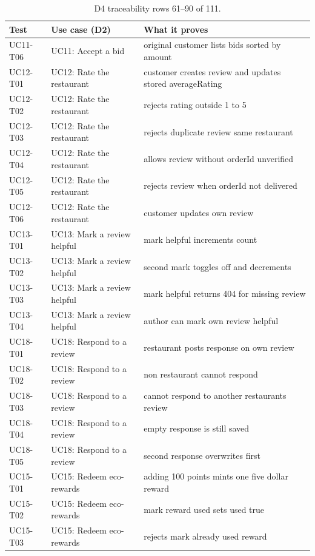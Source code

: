 \begin{table}[t]
\caption{D4 traceability rows 61--90 of 111.}
\label{tab:d4t3}
\centering\scriptsize
\begin{tabular}{p{3.2cm}p{4.0cm}p{5.8cm}}
\toprule
Test & Use case (D2) & What it proves \\
\midrule
UC11-T06 & UC11: Accept a bid & original customer lists bids sorted by amount \\
UC12-T01 & UC12: Rate the restaurant & customer creates review and updates stored averageRating \\
UC12-T02 & UC12: Rate the restaurant & rejects rating outside 1 to 5 \\
UC12-T03 & UC12: Rate the restaurant & rejects duplicate review same restaurant \\
UC12-T04 & UC12: Rate the restaurant & allows review without orderId unverified \\
UC12-T05 & UC12: Rate the restaurant & rejects review when orderId not delivered \\
UC12-T06 & UC12: Rate the restaurant & customer updates own review \\
UC13-T01 & UC13: Mark a review helpful & mark helpful increments count \\
UC13-T02 & UC13: Mark a review helpful & second mark toggles off and decrements \\
UC13-T03 & UC13: Mark a review helpful & mark helpful returns 404 for missing review \\
UC13-T04 & UC13: Mark a review helpful & author can mark own review helpful \\
UC18-T01 & UC18: Respond to a review & restaurant posts response on own review \\
UC18-T02 & UC18: Respond to a review & non restaurant cannot respond \\
UC18-T03 & UC18: Respond to a review & cannot respond to another restaurants review \\
UC18-T04 & UC18: Respond to a review & empty response is still saved \\
UC18-T05 & UC18: Respond to a review & second response overwrites first \\
UC15-T01 & UC15: Redeem eco-rewards & adding 100 points mints one five dollar reward \\
UC15-T02 & UC15: Redeem eco-rewards & mark reward used sets used true \\
UC15-T03 & UC15: Redeem eco-rewards & rejects mark already used reward \\

\end{tabular}
\end{table}
